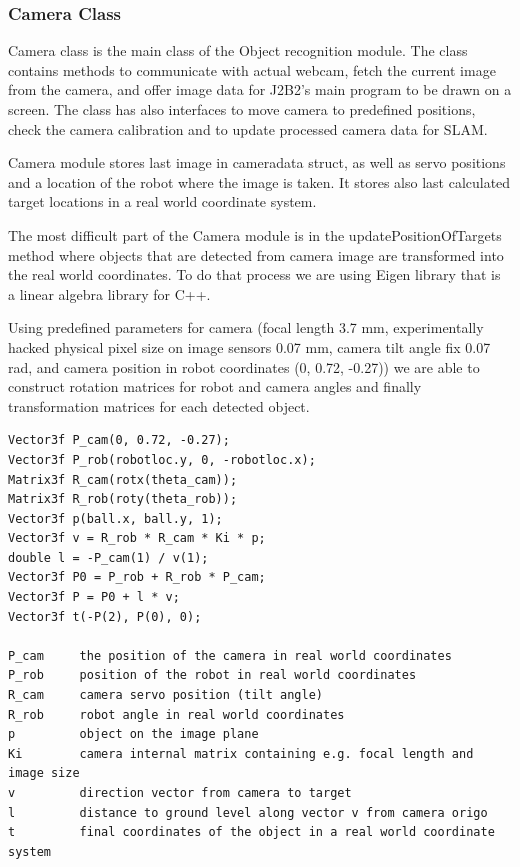\documentclass[a4paper,10pt]{article}
\begin{document}
\subsubsection{Camera Class}

Camera class is the main class of the Object recognition module. The class contains methods to communicate with actual webcam, fetch the current image from the camera, and offer image data for J2B2's main program to be drawn on a screen. The class has also interfaces to move camera to predefined positions, check the camera calibration and to update processed camera data for SLAM.

Camera module stores last image in cameradata struct, as well as servo positions and a location of the robot where the image is taken. It stores also last calculated target locations in a real world coordinate system.

The most difficult part of the Camera module is in the updatePositionOfTargets method where objects that are detected from camera image are transformed into the real world coordinates. To do that process we are using Eigen library that is a linear algebra library for C++.

Using predefined parameters for camera (focal length 3.7 mm, experimentally hacked physical pixel size on image sensors 0.07 mm, camera tilt angle fix 0.07 rad, and camera position in robot coordinates (0, 0.72, -0.27)) we are able to construct rotation matrices for robot and camera angles and finally transformation matrices for each detected object.

\begin{verbatim}
Vector3f P_cam(0, 0.72, -0.27);
Vector3f P_rob(robotloc.y, 0, -robotloc.x);
Matrix3f R_cam(rotx(theta_cam));
Matrix3f R_rob(roty(theta_rob));
Vector3f p(ball.x, ball.y, 1);
Vector3f v = R_rob * R_cam * Ki * p;
double l = -P_cam(1) / v(1);
Vector3f P0 = P_rob + R_rob * P_cam;
Vector3f P = P0 + l * v;
Vector3f t(-P(2), P(0), 0);

P_cam     the position of the camera in real world coordinates
P_rob     position of the robot in real world coordinates
R_cam     camera servo position (tilt angle)
R_rob     robot angle in real world coordinates
p         object on the image plane
Ki        camera internal matrix containing e.g. focal length and image size
v         direction vector from camera to target
l         distance to ground level along vector v from camera origo
t         final coordinates of the object in a real world coordinate system
\end{verbatim}
\end{document}
